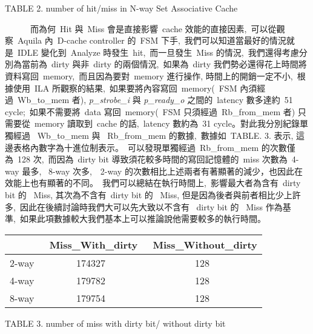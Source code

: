 \documentclass{article}
\begin{document}
\begin{CJK*}{UTF8}{bsmi}
\begin{multicols}{2}
\begin{center}
    \small{TABLE 2. number of hit/miss in N-way Set Associative Cache}\\
\end{center}

\columnbreak

\begin{flushleft}
    \ \ \ \ \ \ 而為何\ Hit 與\ Miss 會是直接影響\ cache 效能的直接因素,\
    可以從觀察\ Aquila 內\ D-cache controller 的\ FSM 下手,\
    我們可以知道當最好的情況就是\ IDLE 變化到\ Analyze 時發生\ hit,\
    而一旦發生\ Miss 的情況,\
    我們還得考慮分別為當前為\ dirty 與非\ dirty 的兩個情況,\
    如果為\ dirty 我們勢必還得花上時間將資料寫回\ memory,\
    而且因為要對\ memory 進行操作, 時間上的開銷一定不小,\
    根據使用\ ILA 所觀察的結果,\
    如果要將內容寫回\ memory(\ FSM 內須經過\ Wb\_to\_mem 者), \emph{p\_strobe\_i} 與 \emph{p\_ready\_o} 之間的\ latency 數多達約\ 51 cycle;\
    如果不需要將\ data 寫回\ memory(\ FSM 只須經過\ Rb\_from\_mem 者) 只需要從\ memory 讀取到\ cache 的話,\
    latency 數約為\ 31 cycle。對此我分別紀錄單獨經過 \ Wb\_to\_mem 與 \ Rb\_from\_mem 的數據,\
    數據如\ TABLE. 3. 表示, 這邊表格內數字為十進位制表示。\
    可以發現單獨經過\ Rb\_from\_mem 的次數僅為\ 128 次,\
    而因為\ dirty bit 導致須花較多時間的寫回記憶體的\ miss 次數為\ 4-way 最多, \ 8-way 次多,\
    \ 2-way 的次數相比上述兩者有著顯著的減少，也因此在效能上也有顯著的不同。\
    我們可以總結在執行時間上,\ 影響最大者為含有\ dirty bit 的 \ Miss, 其次為不含有\ dirty bit 的 \ Miss,
    但是因為後者與前者相比少上許多,\
    因此在後續討論時我們大可以先大致以不含有 \ dirty bit 的 \ Miss 作為基準,\
    如果此項數據較大我們基本上可以推論說他需要較多的執行時間。
\end{flushleft}

\begin{center}
    \begin{tabular}{||c c c ||} 
     \hline
      & \ Miss\_With\_dirty & \ Miss\_Without\_dirty \\ [2ex] 
     \hline\hline
     2-way & 174327 & 128 \\ 
     \hline
     4-way & 179782 & 128 \\ 
     \hline
     8-way & 179754 & 128 \\ 
     \hline
    \end{tabular}
\end{center}

\begin{center}
    \small{TABLE 3. number of miss with dirty bit/ without dirty bit}\\
\end{center}


\end{multicols}
\end{CJK*}
\end{document}
